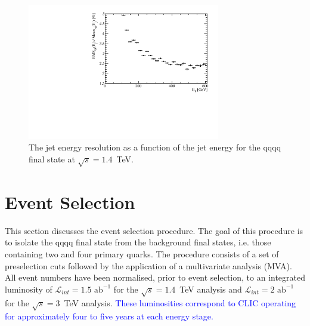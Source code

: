 \begin{figure}
\centering
\includegraphics[width=0.75\textwidth]{PhysicsAnalysis/Plots/JetEnergyResolution/JetEnergyResolutionScan_1400GeV.pdf}
\caption[The jet energy resolution as a function of the jet energy for the {\nu}{\nu}qqqq final state at $\sqrt{s}=1.4$~TeV.]{The jet energy resolution as a function of the jet energy for the {\nu}{\nu}qqqq final state at $\sqrt{s}=1.4$~TeV.}
\label{fig:jeteenrgyresolutionphysicsanalysis}
\end{figure}


\section{Event Selection}
\label{sec:eventselection}
This section discusses the event selection procedure.  The goal of this procedure is to isolate the \nu{\nu}qqqq final state from the background final states, i.e. those containing two and four primary quarks.  The procedure consists of a set of preselection cuts followed by the application of a multivariate analysis (MVA).  All event numbers  have been normalised, prior to event selection, to an integrated luminosity of $\mathcal{L}_{int} = 1.5\text{ ab}^{-1}$ for the $\sqrt{s} = 1.4$~TeV analysis and $\mathcal{L}_{int} = 2\text{ ab}^{-1}$  for the $\sqrt{s} = 3$~TeV analysis.  \textcolor{blue}{These luminosities correspond to CLIC operating for approximately four to five years at each energy stage.}


